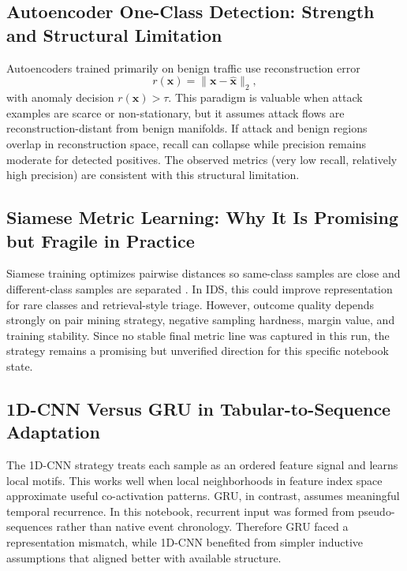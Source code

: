\documentclass[10pt,journal]{IEEEtran}
\begin{document}
\subsection{Autoencoder One-Class Detection: Strength and Structural Limitation}
Autoencoders trained primarily on benign traffic use reconstruction error
\begin{equation}
r(\mathbf{x}) = \lVert \mathbf{x} - \hat{\mathbf{x}}\rVert_2,
\end{equation}
with anomaly decision $r(\mathbf{x}) > \tau$. This paradigm is valuable when attack examples are scarce or non-stationary, but it assumes attack flows are reconstruction-distant from benign manifolds. If attack and benign regions overlap in reconstruction space, recall can collapse while precision remains moderate for detected positives. The observed metrics (very low recall, relatively high precision) are consistent with this structural limitation.

\subsection{Siamese Metric Learning: Why It Is Promising but Fragile in Practice}
Siamese training optimizes pairwise distances so same-class samples are close and different-class samples are separated \cite{koch2015siamese}. In IDS, this could improve representation for rare classes and retrieval-style triage. However, outcome quality depends strongly on pair mining strategy, negative sampling hardness, margin value, and training stability. Since no stable final metric line was captured in this run, the strategy remains a promising but unverified direction for this specific notebook state.

\subsection{1D-CNN Versus GRU in Tabular-to-Sequence Adaptation}
The 1D-CNN strategy treats each sample as an ordered feature signal and learns local motifs. This works well when local neighborhoods in feature index space approximate useful co-activation patterns. GRU, in contrast, assumes meaningful temporal recurrence. In this notebook, recurrent input was formed from pseudo-sequences rather than native event chronology. Therefore GRU faced a representation mismatch, while 1D-CNN benefited from simpler inductive assumptions that aligned better with available structure.
\end{document}
